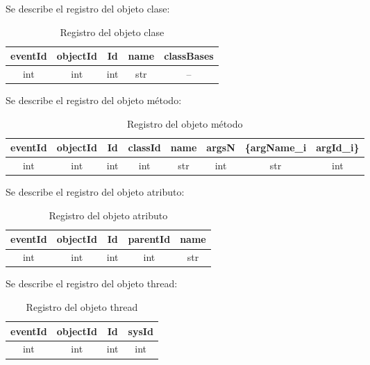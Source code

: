 \documentclass[10pt,a4paper]{article}
\begin{document}
Se describe el registro del objeto clase:\\

\begin{table}[!h]
\begin{center}
\begin{tabular}{| c | c | c | c | c |}
\hline
eventId & objectId & Id & name & classBases\\
\hline
int & int & int & str & --\footnotemark[1]\\
\hline
\end{tabular}
\caption{Registro del objeto clase} 
\end{center}
\end{table}


\newpage
Se describe el registro del objeto método:\\

\begin{table}[!h]
\begin{center}
\begin{tabular}{| c | c | c | c | c | c | c | c |}
\hline
eventId & objectId & Id & classId & name & argsN & \{argName_{i} & argId_{i}\}\\
\hline
int & int & int & int & str & int & str & int \\
\hline
\end{tabular}
\caption{Registro del objeto método} 
\end{center}
\end{table}


Se describe el registro del objeto atributo:\\

\begin{table}[!h]
\begin{center}
\begin{tabular}{| c | c | c | c | c |}
\hline
eventId & objectId & Id & parentId & name\\
\hline
int & int & int & int & str\\
\hline
\end{tabular}
\caption{Registro del objeto atributo} 
\end{center}
\end{table}


Se describe el registro del objeto thread: \\

\begin{table}[!h]
\begin{center}
\begin{tabular}{| c | c | c | c |}
\hline
eventId & objectId & Id & sysId\\
\hline
int & int & int & int\\
\hline
\end{tabular}
\caption{Registro del objeto thread} 
\end{center}
\end{table}
\end{document}
